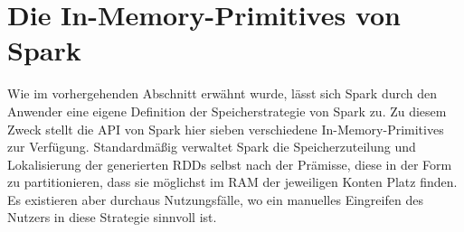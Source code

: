 \newpage

\section{Die In-Memory-Primitives von Spark}
\label{section:in Memory Primvs}

Wie im vorhergehenden Abschnitt erwähnt wurde, lässt sich Spark durch den Anwender eine eigene Definition der Speicherstrategie von Spark zu. Zu diesem Zweck stellt die API von Spark hier sieben verschiedene In-Memory-Primitives zur Verfügung. Standardmäßig verwaltet Spark die Speicherzuteilung und Lokalisierung der generierten RDDs selbst nach der Prämisse,  diese in der Form zu partitionieren, dass sie möglichst im RAM der jeweiligen Konten Platz finden. Es existieren aber durchaus Nutzungsfälle, wo ein manuelles Eingreifen des Nutzers in diese Strategie sinnvoll ist.  

